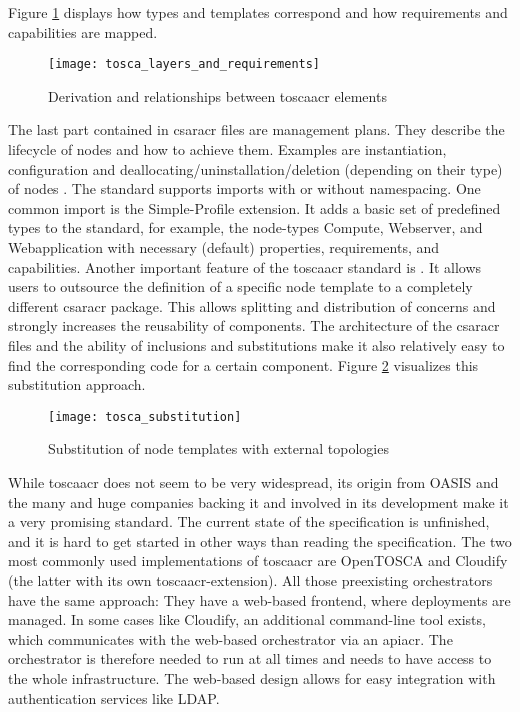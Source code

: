 Figure \ref{image:tosca_layers_and_requirements} displays how types and templates correspond and how requirements and capabilities are mapped.

\begin{figure}[H]
  \texttt{[image: tosca\_layers\_and\_requirements]}
  \centering
  \caption{Derivation and relationships between \gls{toscaacr} elements \cite{tosca_standard_v2}}
  \label{image:tosca_layers_and_requirements}
\end{figure}

The last part contained in \gls{csaracr} files are management plans. They describe the lifecycle of nodes and how to achieve them. Examples are instantiation, configuration and deallocating/uninstallation/deletion (depending on their type) of nodes \cite{tosca_standard_v2}.
\newline
The standard supports imports with or without namespacing. One common import is the Simple-Profile extension.
It adds a basic set of predefined types to the standard, for example, the node-types Compute, Webserver, and Webapplication with necessary (default) properties, requirements, and capabilities.
\newline
Another important feature of the \gls{toscaacr} standard is . It allows users to outsource the definition of a specific node template to a completely different \gls{csaracr} package. This allows splitting and distribution of concerns and strongly increases the reusability of components. The architecture of the \gls{csaracr} files and the ability of inclusions and substitutions make it also relatively easy to find the corresponding code for a certain component. Figure \ref{image:tosca_substitution} visualizes this substitution approach.

\begin{figure}[H]
  \texttt{[image: tosca\_substitution]}
  \centering
  \caption{Substitution of node templates with external topologies \cite{tosca_standard_v2}}
  \label{image:tosca_substitution}
\end{figure}

While \gls{toscaacr} does not seem to be very widespread, its origin from OASIS and the many and huge companies backing it and involved in its development make it a very promising standard. The current state of the specification is unfinished, and it is hard to get started in other ways than reading the specification.
\newline
The two most commonly used implementations of \gls{toscaacr} are OpenTOSCA and Cloudify (the latter with its own \gls{toscaacr}-extension). All those preexisting orchestrators have the same approach: They have a web-based frontend, where deployments are managed. In some cases like Cloudify, an additional command-line tool exists, which communicates with the web-based orchestrator via an \gls{apiacr}. The orchestrator is therefore needed to run at all times and needs to have access to the whole infrastructure. The web-based design allows for easy integration with authentication services like LDAP.


